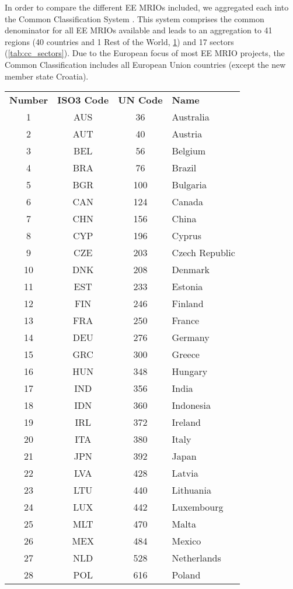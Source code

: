 In order to compare the different EE MRIOs included, we aggregated each into the Common Classification System \cite{Steen_Olsen_2014}. 
This system comprises the common denominator for all EE MRIOs available and leads to an aggregation to 41 regions (40 countries and 1 Rest of the World, \ref{tab:cc_regions}) and 17 sectors (\ref{tab:cc_sectors}). 
Due to the European focus of most EE MRIO projects, the Common Classification includes all European Union countries (except the new member state Croatia).


\begin{table}
\label{tab:cc_regions}
\begin{tabular}{ c c c l }
\textbf{Number} & \textbf{ISO3 Code} & \textbf{UN Code} & \textbf{Name}\\
1&AUS & 36 & Australia\\
2&AUT & 40 & Austria\\
3&BEL & 56 & Belgium\\
4&BRA & 76 & Brazil\\
5&BGR & 100 & Bulgaria\\
6&CAN & 124 & Canada\\
7&CHN & 156 & China\\
8&CYP & 196 & Cyprus\\
9&CZE & 203 & Czech Republic\\
10&DNK & 208 & Denmark\\
11&EST & 233 & Estonia\\
12&FIN & 246 & Finland\\
13&FRA & 250 & France\\
14&DEU & 276 & Germany\\
15&GRC & 300 & Greece\\
16&HUN & 348 & Hungary\\
17&IND & 356 & India\\
18&IDN & 360 & Indonesia\\
19&IRL & 372 & Ireland\\
20&ITA & 380 & Italy\\
21&JPN & 392 & Japan\\
22&LVA & 428 & Latvia\\
23&LTU & 440 & Lithuania\\
24&LUX & 442 & Luxembourg\\
25&MLT & 470 & Malta\\
26&MEX & 484 & Mexico\\
27&NLD & 528 & Netherlands\\
28&POL & 616 & Poland\\

\end{tabular}
\end{table}
